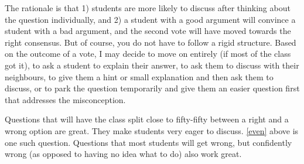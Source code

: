 \documentclass[11pt]{article}
\begin{document}
	{\baselineskip The rationale is that 1) students are more likely to discuss after thinking about the question individually, and 2) a student with a good argument will convince a student with a bad argument, and the second vote will have moved towards the right consensus. But of course, you do not have to follow a rigid structure. Based on the outcome of a vote, I may decide to move on entirely (if most of the class got it), to ask a student to explain their answer, to ask them to discuss with their neighbours, to give them a hint or small explanation and then ask them to discuss, or to park the question temporarily and give them an easier question first that addresses the misconception.

	Questions that will have the class split close to fifty-fifty between a right and a wrong option are great. They make students very eager to discuss. \autoref{even} above is one such question. Questions that most students will get wrong, but confidently wrong (as opposed to having no idea what to do) also work great. }

	\vspace{.5cm}
\end{document}
